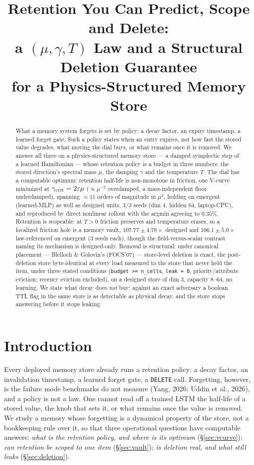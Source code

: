 \documentclass{article}
\title{Retention You Can Predict, Scope and Delete:\\ a $(\mu,\gamma,T)$ Law and a Structural Deletion Guarantee\\ for a Physics-Structured Memory Store}
\author{}
\begin{document}
\maketitle
\begin{abstract}
What a memory system forgets is set by policy: a decay factor, an expiry timestamp, a learned forget gate. Such a policy states when an entry expires, not how fast the stored value degrades, what moving the dial buys, or what remains once it is removed. We answer all three on a physics-structured memory store --- a damped symplectic step of a learned Hamiltonian --- whose retention policy is a budget in three numbers: the stored direction's spectral mass $\mu$, the damping $\gamma$ and the temperature $T$. The dial has a computable optimum: retention half-life is non-monotone in friction, one V-curve minimized at $\gamma_{\rm crit}=2\varepsilon\mu$ ($\propto\mu^{-2}$ overdamped, a mass-independent floor underdamped), spanning $\approx11$ orders of magnitude in $\mu^2$, holding on emergent (learned-MLP) as well as designed units, 3/3 seeds (dim 4, hidden 64, laptop-CPU), and reproduced by direct nonlinear rollout with the argmin agreeing to $0.35\%$. Retention is scopeable: at $T>0$ friction preserves and temperature erases, so a localized friction hole is a memory vault, $107.77\pm4.78\times$ designed and $106.1\pm5.0\times$ law-referenced on emergent (3 seeds each), though the field-versus-scalar contrast naming its mechanism is designed-only. Removal is structural: under canonical placement --- Blelloch \& Golovin's (FOCS'07) --- store-level deletion is exact, the post-deletion store byte-identical at every load measured to the store that never held the item, under three stated conditions (\texttt{budget >= n\_cells}, \texttt{leak = 0}, priority/attribute eviction; recency eviction excluded), on a designed store of dim 3, capacity 8--64, no learning. We state what decay does \emph{not} buy: against an exact adversary a boolean TTL flag in the same store is as detectable as physical decay, and the store stops answering before it stops leaking.
\end{abstract}

\section{Introduction}\label{sec:intro}

Every deployed memory store already runs a retention policy: a decay factor, an invalidation timestamp, a learned forget gate, a \texttt{DELETE} call. Forgetting, however, is the failure mode benchmarks do not measure (Yang, 2026; Uddin et al., 2026), and a policy is not a law. One cannot read off a trained LSTM the half-life of a stored value, the knob that sets it, or what remains once the value is removed. We study a memory whose forgetting is a dynamical property of the store, not a bookkeeping rule over it, so that three operational questions have computable answers: \emph{what is the retention policy, and where is its optimum} (\S\ref{sec:vcurve}); \emph{can retention be scoped to one item} (\S\ref{sec:vault}); \emph{is deletion real, and what still leaks} (\S\ref{sec:deletion}).
\end{document}
